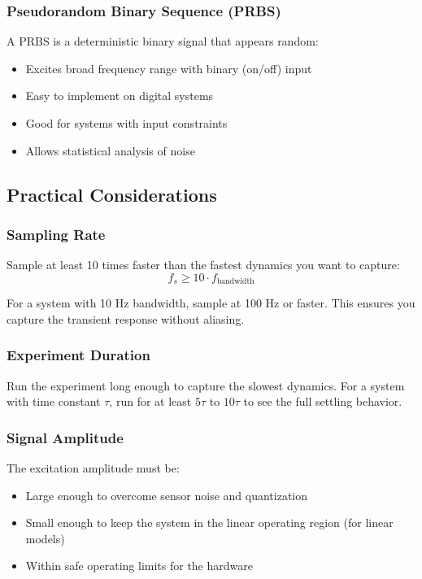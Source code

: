 \subsubsection{Pseudorandom Binary Sequence (PRBS)}

A PRBS is a deterministic binary signal that appears random:
\begin{itemize}
    \item Excites broad frequency range with binary (on/off) input
    \item Easy to implement on digital systems
    \item Good for systems with input constraints
    \item Allows statistical analysis of noise
\end{itemize}

\subsection{Practical Considerations}

\subsubsection{Sampling Rate}

Sample at least 10 times faster than the fastest dynamics you want to capture:
\begin{equation}
f_s \geq 10 \cdot f_{\text{bandwidth}}
\end{equation}

For a system with 10 Hz bandwidth, sample at 100 Hz or faster. This ensures you capture the transient response without aliasing.

\subsubsection{Experiment Duration}

Run the experiment long enough to capture the slowest dynamics. For a system with time constant $\tau$, run for at least $5\tau$ to $10\tau$ to see the full settling behavior.

\subsubsection{Signal Amplitude}

The excitation amplitude must be:
\begin{itemize}
    \item Large enough to overcome sensor noise and quantization
    \item Small enough to keep the system in the linear operating region (for linear models)
    \item Within safe operating limits for the hardware
\end{itemize}

